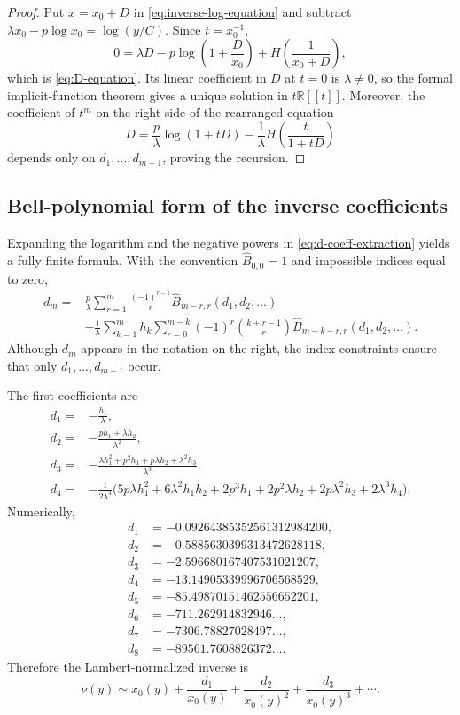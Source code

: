 \documentclass[11pt,oneside]{article}
\numberwithin{equation}{section}
\theoremstyle{plain}
\theoremstyle{definition}
\theoremstyle{remark}
\newcommand{\R}{\mathbb R}
\newcommand{\Bhat}{\widehat{B}}
\begin{document}
\begin{proof}
Put $x=x_0+D$ in \eqref{eq:inverse-log-equation} and subtract
$\lambda x_0-p\log x_0=\log(y/C)$.  Since $t=x_0^{-1}$,
\[
 0=\lambda D-p\log\left(1+\frac D{x_0}\right)
 +H\left(\frac1{x_0+D}\right),
\]
which is \eqref{eq:D-equation}.  Its linear coefficient in $D$ at $t=0$ is
$\lambda\ne0$, so the formal implicit-function theorem gives a unique
solution in $t\R[[t]]$.  Moreover, the coefficient of $t^m$ on the right
side of the rearranged equation
\[
 D=\frac p\lambda\log(1+tD)
   -\frac1\lambda H\left(\frac{t}{1+tD}\right)
\]
depends only on $d_1,\ldots,d_{m-1}$, proving the recursion.
\end{proof}

\subsection{Bell-polynomial form of the inverse coefficients}

Expanding the logarithm and the negative powers in
\eqref{eq:d-coeff-extraction} yields a fully finite formula.  With the
convention $\Bhat_{0,0}=1$ and impossible indices equal to zero,
\begin{align}
 d_m={}&\frac p\lambda
 \sum_{r=1}^{m}\frac{(-1)^{r-1}}r
 \Bhat_{m-r,r}(d_1,d_2,\ldots)
 \label{eq:d-bell-first}\\
 &-\frac1\lambda\sum_{k=1}^{m}h_k
 \sum_{r=0}^{m-k}(-1)^r\binom{k+r-1}{r}
 \Bhat_{m-k-r,r}(d_1,d_2,\ldots).
 \label{eq:d-bell-second}
\end{align}
Although $d_m$ appears in the notation on the right, the index constraints
ensure that only $d_1,\ldots,d_{m-1}$ occur.

The first coefficients are
\begin{align}
 d_1={}&-\frac{h_1}{\lambda},\label{eq:d1}\\
 d_2={}&-\frac{ph_1+\lambda h_2}{\lambda^2},\label{eq:d2}\\
 d_3={}&-\frac{\lambda h_1^2+p^2h_1+p\lambda h_2+\lambda^2h_3}
 {\lambda^3},\label{eq:d3}\\
 d_4={}&-\frac{1}{2\lambda^4}
 \bigl(5p\lambda h_1^2+6\lambda^2h_1h_2+2p^3h_1
 +2p^2\lambda h_2+2p\lambda^2h_3+2\lambda^3h_4\bigr).
 \label{eq:d4}
\end{align}
Numerically,
\begin{align*}
 d_1&=-0.09264385352561312984200,\\
 d_2&=-0.5885630399313472628118,\\
 d_3&=-2.596680167407531021207,\\
 d_4&=-13.14905339996706568529,\\
 d_5&=-85.49870151462556652201,\\
 d_6&=-711.262914832946\ldots,\\
 d_7&=-7306.78827028497\ldots,\\
 d_8&=-89561.7608826372\ldots.
\end{align*}
Therefore the Lambert-normalized inverse is
\begin{equation}\label{eq:inverse-lambert-series}
 \boxed{
 \nu(y)\sim x_0(y)+\frac{d_1}{x_0(y)}+
 \frac{d_2}{x_0(y)^2}+\frac{d_3}{x_0(y)^3}+\cdots.}
\end{equation}
\end{document}
